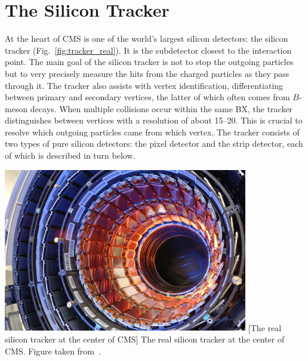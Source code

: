 \section{The Silicon Tracker}
\label{sec:tracker}
At the heart of CMS is one of the world's largest silicon detectors: the silicon tracker (Fig.~\ref{fig:tracker_real}).
It is the subdetector closest to the \pp interaction point.
The main goal of the silicon tracker is not to stop the outgoing particles but to very precisely measure the hits from the charged particles as they pass through it.
The tracker also assists with vertex identification, differentiating between primary and secondary vertices, the latter of which often comes from $B$-meson decays.
When multiple \pp collisions occur within the same BX, the tracker distinguishes between \pp vertices with a resolution of about 15--20\mum.
This is crucial to resolve which outgoing particles came from which \pp vertex.
The tracker consists of two types of pure silicon detectors: the pixel detector and the strip detector, each of which is described in turn below.
\begin{multiFigure}
    \centering
    \includegraphics[width=0.8\textwidth]{figures/cms/tracker/silicon_tracker_real.jpg}
        [The real silicon tracker at the center of CMS]
        {The real silicon tracker at the center of CMS. Figure taken from~\cite{tracker_real}.}
    \label{fig:tracker_real}
\end{multiFigure}

